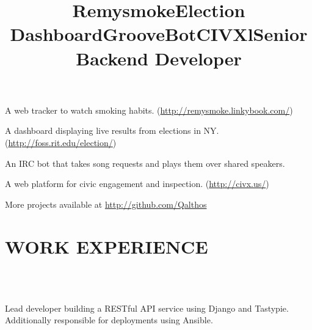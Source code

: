 \documentclass[line]{res}
\begin{document}
\begin{resume}
    \title{Remysmoke}
    \begin{position}
        A web tracker to watch smoking habits.
        (\url{http://remysmoke.linkybook.com/})
    \end{position}

    \title{Election Dashboard}
    \begin{position}
        A dashboard displaying live results from elections in NY.
        (\url{http://foss.rit.edu/election/})
    \end{position}

    \title{GrooveBot}
    \begin{position}
        An IRC bot that takes song requests and plays them over shared speakers.
    \end{position}

    \title{CIVX}
    \begin{position}
        A web platform for civic engagement and inspection.
        (\url{http://civx.us/})
    \end{position}

    More projects available at \url{http://github.com/Qalthos}

\section{WORK EXPERIENCE}
    \begin{format}
        \title{l}\\
        \\
        \body
    \end{format}

    \title{Senior Backend Developer}
    \begin{position}
        Lead developer building a RESTful API service using Django and Tastypie.
        Additionally responsible for deployments using Ansible.


\end{position}
\end{resume}
\end{document}

